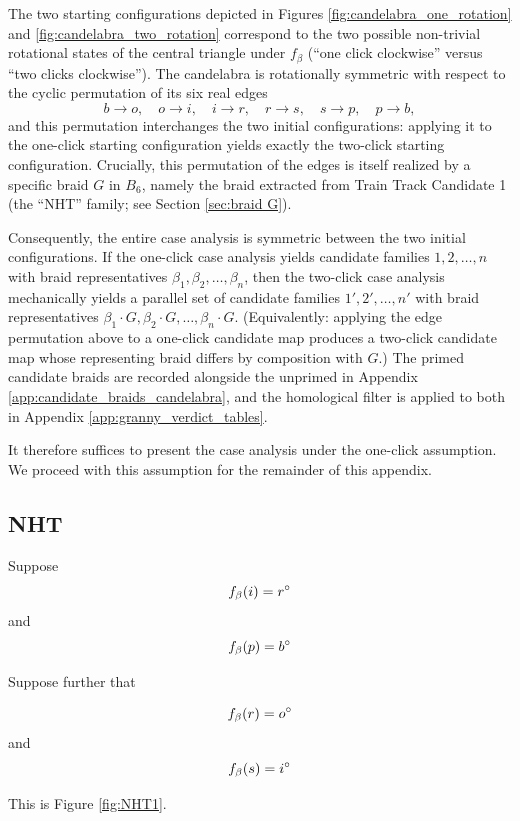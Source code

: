 \begin{remark}\label{rem:candelabra_rotation}
The two starting configurations depicted in Figures \ref{fig:candelabra_one_rotation} and \ref{fig:candelabra_two_rotation} correspond to the two possible non-trivial rotational states of the central triangle under $f_\beta$ (``one click clockwise'' versus ``two clicks clockwise''). The candelabra is rotationally symmetric with respect to the cyclic permutation of its six real edges
\[
b \to o, \quad o \to i, \quad i \to r, \quad r \to s, \quad s \to p, \quad p \to b,
\]
and this permutation interchanges the two initial configurations: applying it to the one-click starting configuration yields exactly the two-click starting configuration. Crucially, this permutation of the edges is itself realized by a specific braid $G$ in $B_6$, namely the braid extracted from Train Track Candidate 1 (the ``NHT'' family; see Section \ref{sec:braid G}).

Consequently, the entire case analysis is symmetric between the two initial configurations. If the one-click case analysis yields candidate families $1, 2, \ldots, n$ with braid representatives $\beta_1, \beta_2, \ldots, \beta_n$, then the two-click case analysis mechanically yields a parallel set of candidate families $1', 2', \ldots, n'$ with braid representatives $\beta_1 \cdot G, \beta_2 \cdot G, \ldots, \beta_n \cdot G$. (Equivalently: applying the edge permutation above to a one-click candidate map produces a two-click candidate map whose representing braid differs by composition with $G$.) The primed candidate braids are recorded alongside the unprimed in Appendix \ref{app:candidate_braids_candelabra}, and the homological filter is applied to both in Appendix \ref{app:granny_verdict_tables}.

It therefore suffices to present the case analysis under the one-click assumption. We proceed with this assumption for the remainder of this appendix.
\end{remark}


\subsection{NHT}\label{NHT}
Suppose
$$f_\beta(i) = r^\circ$$
and
$$f_\beta(p) = b^\circ$$

Suppose further that 

$$f_\beta(r) = o^\circ$$
and
$$f_\beta(s) = i^\circ$$

This is Figure \ref{fig:NHT1}.

